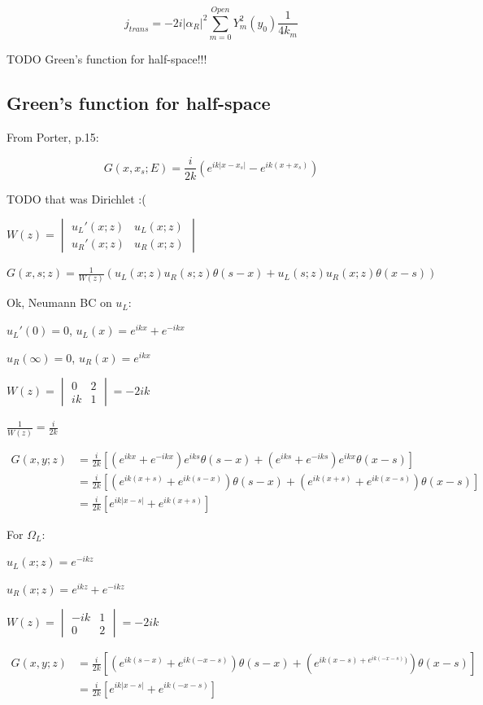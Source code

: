 \documentclass[12pt, a4paper]{article}
\begin{document}
$$j_{trans} = -2i |\alpha_R|^2 \sum\limits_{m = 0}^{Open} Y_m^2(y_0) \frac{1}{4 k_m}$$

TODO Green's function for half-space!!!

\subsection{Green's function for half-space}
From Porter, p.15:

$$G(x, x_s; E) = \frac{i}{2 k} \left( e^{i k |x - x_s|} - e^{i k (x + x_s)} \right)$$

TODO that was Dirichlet :(


$W(z) = \begin{vmatrix} u_L'(x; z) & u_L(x; z) \\ u_R'(x; z) & u_R(x; z)\end{vmatrix}$

$G(x, s; z) = \frac{1}{W(z)} (u_L(x; z) u_R(s; z) \theta(s - x) + u_L(s; z) u_R(x; z) \theta(x - s))$ 

Ok, Neumann BC on $u_L$:

$u_L'(0) = 0$, $u_L(x) = e^{ikx} + e^{-ikx}$

$u_R(\infty) = 0$, $u_R(x) = e^{ikx}$

$W(z) = \begin{vmatrix} 0 & 2\\ ik & 1 \end{vmatrix} = -2 i k$

$\frac{1}{W(z)} = \frac{i}{2k}$

\begin{align*}
G(x, y; z)
&= \frac{i}{2k} [(e^{ikx} + e^{-ikx}) e^{iks} \theta(s - x) +  (e^{iks} + e^{-iks}) e^{ikx} \theta(x - s)] \\
&= \frac{i}{2k} [(e^{ik(x + s)} + e^{ik(s - x)}) \theta(s - x) + (e^{ik(x + s)} + e^{ik (x - s)}) \theta(x - s)] \\
&= \frac{i}{2k} [e^{ik|x - s|} + e^{ik (x + s)}]
\end{align*}

For $\Omega_L$:

$u_L(x; z) = e^{-ikz}$

$u_R(x; z) = e^{ikz} + e^{-ikz}$

$W(z) = \begin{vmatrix} -ik & 1 \\ 0 & 2\end{vmatrix} = -2 ik$

\begin{align*}
G(x, y; z)
&= \frac{i}{2k} [(e^{ik (s - x)} + e^{ik (-x - s)}) \theta(s - x) + (e^{ik (x - s) + e^{ik(-x - s)})}) \theta(x - s)] \\
&= \frac{i}{2k} [e^{ik |x - s|} + e^{ik (-x - s)}]
\end{align*}
\end{document}
